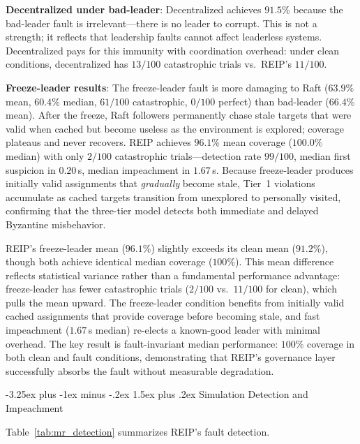 \documentclass[conference]{IEEEtran}
\makeatletter
\renewcommand{\subsection}{\@startsection{subsection}{2}{\z@}%
  {-3.25ex plus -1ex minus -.2ex}%
  {1.5ex plus .2ex}%
  {\normalfont\normalsize\itshape\centering}}
\makeatother
\begin{document}
\textbf{Decentralized under bad-leader}: Decentralized achieves $91.5\%$ because the bad-leader fault is irrelevant---there is no leader to corrupt. This is not a strength; it reflects that leadership faults cannot affect leaderless systems. Decentralized pays for this immunity with coordination overhead: under clean conditions, decentralized has $13/100$ catastrophic trials vs.\ REIP's $11/100$.

\textbf{Freeze-leader results}: The freeze-leader fault is more damaging to Raft ($63.9\%$ mean, $60.4\%$ median, $61/100$ catastrophic, $0/100$ perfect) than bad-leader ($66.4\%$ mean). After the freeze, Raft followers permanently chase stale targets that were valid when cached but become useless as the environment is explored; coverage plateaus and never recovers. REIP achieves $96.1\%$ mean coverage ($100.0\%$ median) with only $2/100$ catastrophic trials---detection rate $99/100$, median first suspicion in $0.20\,$s, median impeachment in $1.67\,$s. Because freeze-leader produces initially valid assignments that \emph{gradually} become stale, Tier~1 violations accumulate as cached targets transition from unexplored to personally visited, confirming that the three-tier model detects both immediate and delayed Byzantine misbehavior.

REIP's freeze-leader mean ($96.1\%$) slightly exceeds its clean mean ($91.2\%$), though both achieve identical median coverage ($100\%$). This mean difference reflects statistical variance rather than a fundamental performance advantage: freeze-leader has fewer catastrophic trials ($2/100$ vs.\ $11/100$ for clean), which pulls the mean upward. The freeze-leader condition benefits from initially valid cached assignments that provide coverage before becoming stale, and fast impeachment ($1.67$\,s median) re-elects a known-good leader with minimal overhead. The key result is fault-invariant median performance: $100\%$ coverage in both clean and fault conditions, demonstrating that REIP's governance layer successfully absorbs the fault without measurable degradation.


\subsection{Simulation Detection and Impeachment}

Table~\ref{tab:mr_detection} summarizes REIP's fault detection.
\end{document}
